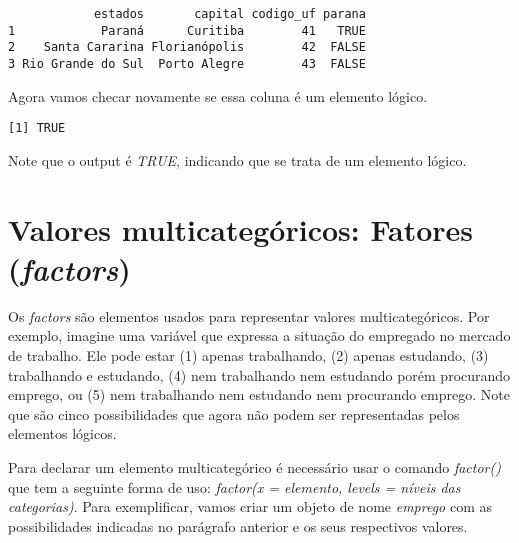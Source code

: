\documentclass[
  letterpaper,
  DIV=11,
  numbers=noendperiod]{scrreprt}
\newenvironment{Shaded}{\begin{snugshade}}{\end{snugshade}}
\newcommand{\FunctionTok}[1]{\textcolor[rgb]{0.28,0.35,0.67}{#1}}
\newcommand{\NormalTok}[1]{\textcolor[rgb]{0.00,0.23,0.31}{#1}}
\newcommand{\OtherTok}[1]{\textcolor[rgb]{0.00,0.23,0.31}{#1}}
\newcommand{\SpecialCharTok}[1]{\textcolor[rgb]{0.37,0.37,0.37}{#1}}
\begin{document}
\begin{Shaded}
\end{Shaded}

\begin{verbatim}
            estados       capital codigo_uf parana
1            Paraná      Curitiba        41   TRUE
2    Santa Cararina Florianópolis        42  FALSE
3 Rio Grande do Sul  Porto Alegre        43  FALSE
\end{verbatim}

Agora vamos checar novamente se essa coluna é um elemento lógico.

\begin{Shaded}
\end{Shaded}

\begin{verbatim}
[1] TRUE
\end{verbatim}

Note que o output é \emph{TRUE}, indicando que se trata de um elemento
lógico.

\section{\texorpdfstring{Valores multicategóricos: Fatores
(\emph{factors})}{Valores multicategóricos: Fatores (factors)}}\label{valores-multicateguxf3ricos-fatores-factors}

Os \emph{factors} são elementos usados para representar valores
multicategóricos. Por exemplo, imagine uma variável que expressa a
situação do empregado no mercado de trabalho. Ele pode estar (1) apenas
trabalhando, (2) apenas estudando, (3) trabalhando e estudando, (4) nem
trabalhando nem estudando porém procurando emprego, ou (5) nem
trabalhando nem estudando nem procurando emprego. Note que são cinco
possibilidades que agora não podem ser representadas pelos elementos
lógicos.

Para declarar um elemento multicategórico é necessário usar o comando
\emph{factor()} que tem a seguinte forma de uso: \emph{factor(x =
elemento, levels = níveis das categorias)}. Para exemplificar, vamos
criar um objeto de nome \emph{emprego} com as possibilidades indicadas
no parágrafo anterior e os seus respectivos valores.
\end{document}
